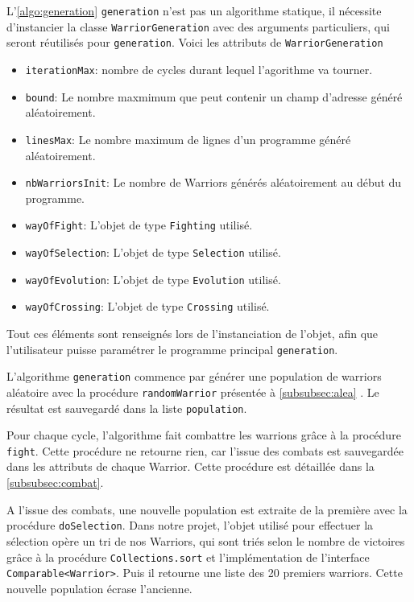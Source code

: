 \documentclass[hidelinks]{report}
\begin{document}
L'\autoref{algo:generation} \texttt{generation} n'est pas un algorithme statique, il nécessite d'instancier la classe \texttt{WarriorGeneration} avec des arguments particuliers, qui seront réutilisés pour \texttt{generation}.
Voici les attributs de \texttt{WarriorGeneration}
\begin{itemize}
    \item \texttt{iterationMax}: nombre de cycles durant lequel l'agorithme va tourner.
    \item \texttt{bound}: Le nombre maxmimum que peut contenir un champ d'adresse généré aléatoirement.
    \item \texttt{linesMax}: Le nombre maximum de lignes d'un programme généré aléatoirement.
    \item \texttt{nbWarriorsInit}: Le nombre de Warriors générés aléatoirement au début du programme.
    \item \texttt{wayOfFight}: L'objet de type \texttt{Fighting} utilisé.
    \item \texttt{wayOfSelection}: L'objet de type \texttt{Selection} utilisé.
    \item \texttt{wayOfEvolution}: L'objet de type \texttt{Evolution} utilisé.
    \item \texttt{wayOfCrossing}: L'objet de type \texttt{Crossing} utilisé.
\end{itemize}
Tout ces éléments sont renseignés lors de l'instanciation de l'objet, afin que l'utilisateur puisse paramétrer le programme principal \texttt{generation}.

L'algorithme \texttt{generation} commence par générer une population de warriors aléatoire avec la procédure \texttt{randomWarrior} présentée à \autoref{subsubsec:alea}
. Le résultat est sauvegardé dans la liste \texttt{population}. 

Pour chaque cycle, l'algorithme fait combattre les warrions grâce à la procédure \texttt{fight}. Cette procédure ne retourne rien, car l'issue des combats est sauvegardée dans les attributs de chaque Warrior. Cette procédure est détaillée dans la \autoref{subsubsec:combat}.

A l'issue des combats, une nouvelle population est extraite de la première avec la procédure \texttt{doSelection}. Dans notre projet, l'objet utilisé pour effectuer la sélection opère un tri de nos Warriors, qui sont triés selon le nombre de victoires grâce à la procédure \texttt{Collections.sort} et l'implémentation de l'interface \texttt{Comparable<Warrior>}. Puis il retourne une liste des 20 premiers warriors. Cette nouvelle population écrase l'ancienne.
\end{document}
